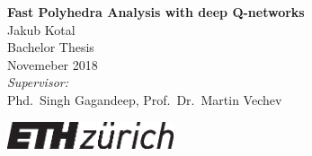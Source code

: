 \documentclass[a4paper,twoside,12pt,nochapterprefix]{scrbook}
\begin{document}
%


\newcommand{\mfytext}[0]{my fancy text}

\newcommand{\chpref}[1]{Chapter \ref{#1}}
\newcommand{\secref}[1]{Section \ref{#1}}
\newcommand{\figref}[1]{Figure \ref{#1}}
\newcommand{\tabref}[1]{Table \ref{#1}}
\newcommand{\apxref}[1]{Appendix \ref{#1}}

%
\begin{titlepage}
	\topmargin 1.0cm
	\oddsidemargin 0.0cm
	\evensidemargin 0.0cm
	\centering
	\Huge
	\vspace{3.0cm}
	\textbf{\textsf{Fast Polyhedra Analysis with deep Q-networks}} \\[2.0cm]
	\vspace{3cm}
	\sffamily
	\Large
	Jakub Kotal
	\\[0.8cm]
	\large
	Bachelor Thesis
	\\
	Novemeber 2018
	\\[1.3cm]
	\emph{Supervisor:}\\
	Phd.\ Singh Gagandeep, 		%
	Prof.\ Dr.\ Martin Vechev		%
	\vfill
	\begin{center}
		\includegraphics*[height=0.8cm]{figures/eth_logo_kurz_pos.eps} \hfill 
	\end{center}
	
	\vspace{3.4cm}
\end{titlepage}
\clearemptydoublepage

\setcounter{page}{1}
\end{document}
